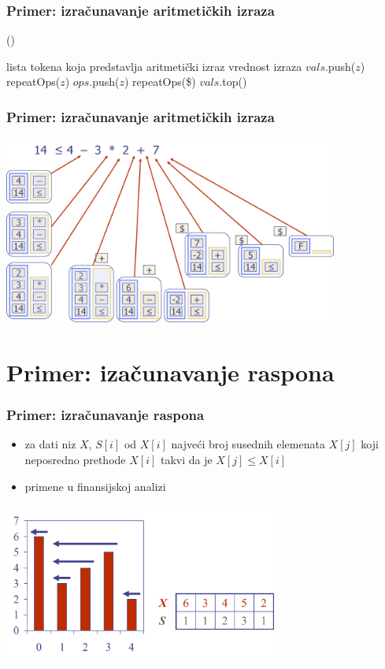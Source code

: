 \documentclass[compress]{beamer}
\begin{document}
\begin{frame}[fragile]
  \frametitle{Primer: izračunavanje aritmetičkih izraza}
()
\begin{algorithmic}
\REQUIRE lista tokena koja predstavlja aritmetički izraz
\ENSURE vrednost izraza
    \STATE $vals$.push($z$)
  \ELSE
    \STATE repeatOps($z$)
    \STATE $ops$.push($z$)
  \ENDIF
\ENDWHILE
\STATE repeatOps(\$)
\RETURN $vals$.top()
\end{algorithmic}
\end{frame}

\begin{frame}[fragile]
  \frametitle{Primer: izračunavanje aritmetičkih izraza}
  \begin{center}
    \includegraphics[width=11cm]{asp-05-pic05.png}
  \end{center}
\end{frame}

\section[P: Raspon]{Primer: izačunavanje raspona}
\begin{frame}[fragile]
  \frametitle{Primer: izračunavanje raspona}
  \begin{itemize}
    \item za dati niz $X$,  $S[i]$ od $X[i]$ najveći broj susednih 
    elemenata $X[j]$ koji neposredno prethode $X[i]$ takvi da je $X[j]\leq X[i]$
    \item primene u finansijskoj analizi 
  \end{itemize}
  \begin{center}
    \includegraphics[width=9cm]{asp-05-pic06.png}
  \end{center}
\end{frame}
\end{document}
